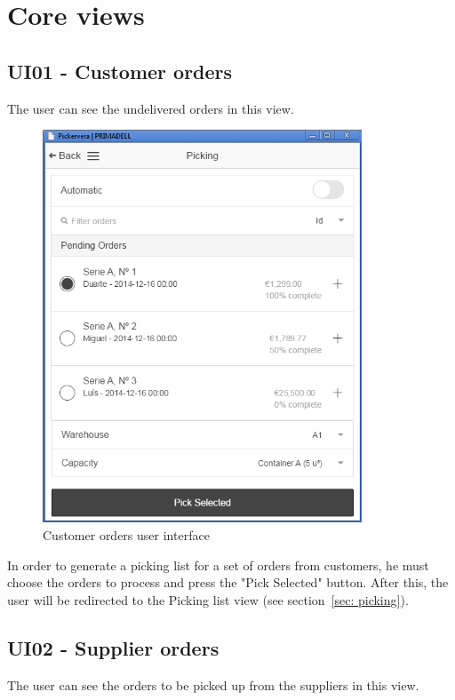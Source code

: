\documentclass[a4paper]{article}
\begin{document}
\newpage

\section{Core views}

\subsection{UI01 - Customer orders}

The user can see the undelivered orders in this view. 

\begin{figure}[h!]
\centerline{\includegraphics[width=9.5cm]{orders.png}}
\caption{Customer orders user interface}
\end{figure}

In order to generate a picking list for a set of orders from customers, he must choose the orders to process and press the "Pick Selected" button. After this, the user will be redirected to the Picking list view (see section~\ref{sec: picking}).

\newpage

\subsection{UI02 - Supplier orders}

The user can see the orders to be picked up from the suppliers in this view. 
\end{document}
